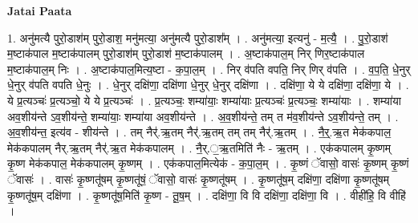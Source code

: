 \documentclass[17pt]{extarticle}
\begin{document}
\textbf{Jatai Paata} \newline

1. अनु॑मत्यै पुरो॒डाश॑म् पुरो॒डाश॒ मनु॑मत्या॒ अनु॑मत्यै 
पुरो॒डाश᳚म् । . अनु॑मत्या॒ इत्यनु॑ - म॒त्यै॒ । . पु॒रो॒डाश॑ म॒ष्टाक॑पाल म॒ष्टाक॑पालम् पुरो॒डाश॑म् पुरो॒डाश॑ म॒ष्टाक॑पालम् । . अ॒ष्टाक॑पाल॒म् निर् णिर॒ष्टाक॑पाल म॒ष्टाक॑पाल॒म् निः । . अ॒ष्टाक॑पाल॒मित्य॒ष्टा - क॒पा॒ल॒म् । . निर् व॑पति वपति॒ निर् णिर् व॑पति । . व॒प॒ति॒ धे॒नुर् धे॒नुर् व॑पति वपति धे॒नुः । . धे॒नुर् दक्षि॑णा॒ दक्षि॑णा धे॒नुर् धे॒नुर् दक्षि॑णा । . दक्षि॑णा॒ ये ये दक्षि॑णा॒ दक्षि॑णा॒ ये । . ये प्र॒त्यञ्चः॑ प्र॒त्यञ्चो॒ ये ये प्र॒त्यञ्चः॑ । . प्र॒त्यञ्चः॒ शम्या॑याः॒ शम्या॑याः प्र॒त्यञ्चः॑ प्र॒त्यञ्चः॒ शम्या॑याः । . शम्या॑या अव॒शीय॑न्ते ऽव॒शीय॑न्ते॒ शम्या॑याः॒ शम्या॑या 
अव॒शीय॑न्ते । . अ॒व॒शीय॑न्ते॒ तम् त म॑व॒शीय॑न्ते ऽव॒शीय॑न्ते॒ तम् । . अ॒व॒शीय॑न्त॒ इत्य॑व - शीय॑न्ते । . तम् नैर्॑.ऋ॒तम् नैर्॑.ऋ॒तम् तम् तम् नैर्॑.ऋ॒तम् । . नै॒र्॒.ऋ॒त मेक॑कपाल॒ मेक॑कपालम् नैर्.ऋ॒तम् नैर्॑.ऋ॒त मेक॑कपालम् । . नै॒र्.॒ऋ॒तमिति॑ नैः - ऋ॒तम् । . एक॑कपालम् कृ॒ष्णम् कृ॒ष्ण मेक॑कपाल॒ मेक॑कपालम् कृ॒ष्णम् । . एक॑कपाल॒मित्येक॑ - क॒पा॒ल॒म् । . कृ॒ष्णं ॅवासो॒ वासः॑ कृ॒ष्णम् कृ॒ष्णं ॅवासः॑ । . वासः॑ कृ॒ष्णतू॑षम् कृ॒ष्णतू॑षं॒ ॅवासो॒ वासः॑ कृ॒ष्णतू॑षम् । . कृ॒ष्णतू॑ष॒म् दक्षि॑णा॒ दक्षि॑णा कृ॒ष्णतू॑षम् कृ॒ष्णतू॑ष॒म् दक्षि॑णा । . कृ॒ष्णतू॑ष॒मिति॑ कृ॒ष्ण - तू॒ष॒म् । . दक्षि॑णा॒ वि वि दक्षि॑णा॒ दक्षि॑णा॒ वि । . वीही॑हि॒ वि वीहि॑ । \newline
\end{document}
